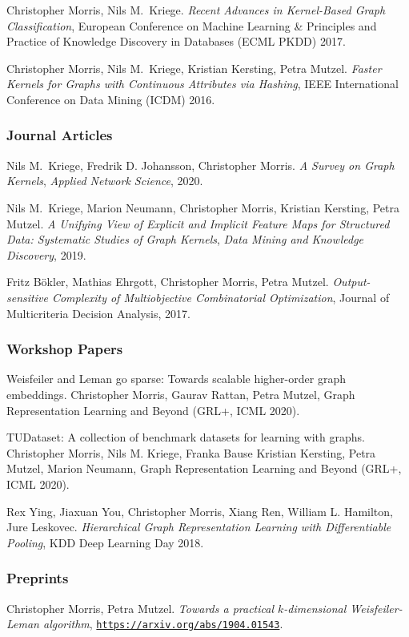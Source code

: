 \documentclass[11pt, a4paper]{scrartcl}
\begin{document}
\begin{thebibliography}{5}
	Christopher Morris, Nils M.~Kriege.
	\emph{Recent Advances in Kernel-Based Graph Classification},
	European Conference on Machine Learning \& Principles and Practice of Knowledge Discovery in Databases (ECML PKDD) 2017.
	
    Christopher Morris, Nils M.~Kriege, Kristian Kersting, Petra Mutzel.
	\emph{Faster Kernels for Graphs with Continuous Attributes via Hashing},
	IEEE International Conference on Data Mining (ICDM) 2016.
	
\subsubsection*{Journal Articles}
Nils M.~Kriege,  Fredrik D. Johansson, Christopher Morris.
\emph{A Survey on Graph Kernels},
\emph{Applied Network Science}, 2020.

Nils M.~Kriege,  Marion Neumann, Christopher Morris, Kristian Kersting, Petra Mutzel.
\emph{A Unifying View of Explicit and Implicit Feature Maps for Structured Data: Systematic Studies of Graph Kernels},
\emph{Data Mining and Knowledge Discovery}, 2019.

Fritz B\"okler, Mathias Ehrgott, Christopher Morris, Petra Mutzel.
\emph{Output-sensitive Complexity of Multiobjective Combinatorial Optimization},
Journal of Multicriteria Decision Analysis, 2017.

\subsubsection*{Workshop Papers}

Weisfeiler and Leman go sparse: Towards scalable higher-order graph embeddings.
Christopher Morris, Gaurav Rattan, Petra Mutzel,
Graph Representation Learning and Beyond (GRL+, ICML 2020).

TUDataset: A collection of benchmark datasets for learning with graphs.
Christopher Morris, Nils M. Kriege, Franka Bause Kristian Kersting, Petra Mutzel, Marion Neumann,
Graph Representation Learning and Beyond (GRL+, ICML 2020).

Rex Ying, Jiaxuan You, Christopher Morris, Xiang Ren, William L. Hamilton, Jure Leskovec.
\emph{Hierarchical Graph Representation Learning with Differentiable Pooling},
KDD Deep Learning Day 2018.

\subsubsection*{Preprints}
Christopher Morris, Petra Mutzel.
\emph{Towards a practical $k$-dimensional Weisfeiler-Leman algorithm},
\texttt{\url{https://arxiv.org/abs/1904.01543}}.


\end{thebibliography}
\end{document}

